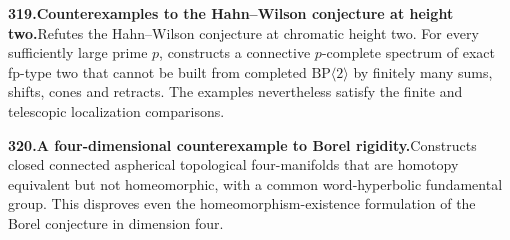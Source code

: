 \documentclass[11pt,a4paper]{article}
\begin{document}
  \par \begin{minipage}{\linewidth}
  \fontsize{10.5}{12.6}\selectfont\RaggedRight
  \hypertarget{result 319}{}
  {\bfseries\textcolor{muted}{319.}\enspace Counterexamples to the Hahn--Wilson conjecture at height two.}\enspace Refutes the Hahn--Wilson conjecture at chromatic height two. For every sufficiently large prime $p$, constructs a connective $p$-complete spectrum of exact fp-type two that cannot be built from completed $\mathrm{BP}\langle2\rangle$ by finitely many sums, shifts, cones and retracts. The examples nevertheless satisfy the finite and telescopic localization comparisons.\par
  \end{minipage}\par\vspace{5pt}



  \par \begin{minipage}{\linewidth}
  \fontsize{10.5}{12.6}\selectfont\RaggedRight
  \hypertarget{result 320}{}
  {\bfseries\textcolor{muted}{320.}\enspace A four-dimensional counterexample to Borel rigidity.}\enspace Constructs closed connected aspherical topological four-manifolds that are homotopy equivalent but not homeomorphic, with a common word-hyperbolic fundamental group. This disproves even the homeomorphism-existence formulation of the Borel conjecture in dimension four.\par
  \end{minipage}\par\vspace{5pt}
\end{document}
